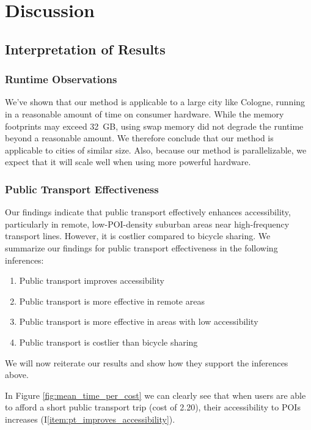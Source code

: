\clearpage
\section{Discussion}
\label{sec:discussion}

\subsection{Interpretation of Results}

\subsubsection{Runtime Observations}
We've shown that our method is applicable to a large city like Cologne, running in a reasonable amount of time on consumer hardware.
While the memory footprints may exceed 32 GB, using swap memory did not degrade the runtime beyond a reasonable amount.
We therefore conclude that our method is applicable to cities of similar size.
Also, because our method is parallelizable, we expect that it will scale well when using more powerful hardware.

\subsubsection{Public Transport Effectiveness}
Our findings indicate that public transport effectively enhances accessibility, particularly in remote, low-POI-density suburban areas near high-frequency transport lines. 
However, it is costlier compared to bicycle sharing.
We summarize our findings for public transport effectiveness in the following inferences:
\begin{enumerate}
  \renewcommand{\labelenumi}{I\theenumi.}
  \item Public transport improves accessibility \label{item:pt_improves_accessibility}
  \item Public transport is more effective in remote areas \label{item:pt_effective_in_remote_areas}
  \item Public transport is more effective in areas with low accessibility \label{item:pt_effective_in_areas_with_low_accessibility}
  \item Public transport is costlier than bicycle sharing \label{item:pt_costlier_than_bicycle_sharing}
\end{enumerate}
We will now reiterate our results and show how they support the inferences above.

In Figure \ref{fig:mean_time_per_cost} we can clearly see that when users are able to afford a short public transport trip (cost of 2.20), their accessibility to POIs increases (I\ref{item:pt_improves_accessibility}).

